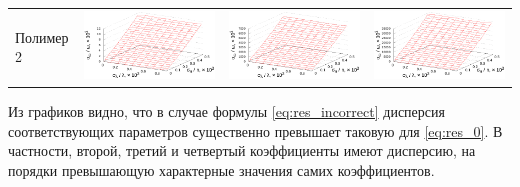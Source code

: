 \documentclass[11pt,a4paper]{article}
\theoremstyle{definition}
\begin{document}
\begin{table}[h]
\begin{tabular}{l | c c c}
	\begin{rotate}{90}Полимер 2\end{rotate} &	\includegraphics[scale=0.4]{figs/all/p2.txt_coeff0.dat.eps} & \includegraphics[scale=0.4]{figs/all/p2.txt_coeff1.dat.eps} & \includegraphics[scale=0.4]{figs/all/p2.txt_coeff2.dat.eps}
  \end{tabular}
  \label{tabl:res_incorrect}
\end{table}

Из графиков видно, что в случае формулы \eqref{eq:res_incorrect} дисперсия соответствующих
параметров существенно превышает таковую для \eqref{eq:res_0}. В частности, второй, третий
и четвертый коэффициенты имеют дисперсию, на порядки превышающую характерные значения самих
коэффициентов.
\end{document}
